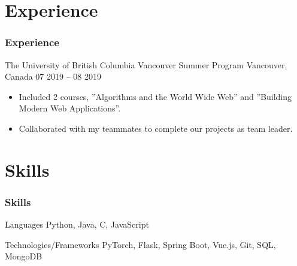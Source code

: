 \documentclass{beamer}
\begin{document}
\section{Experience}
\begin{frame}
    \frametitle{Experience}
    \begin{block}{The University of British Columbia Vancouver Summer Program}
        Vancouver, Canada \hfill 07 2019 – 08 2019
        \begin{itemize}
            \item Included 2 courses, ”Algorithms and the World Wide Web” and ”Building Modern Web Applications”.
            \item Collaborated with my teammates to complete our projects as team leader.
        \end{itemize}
    \end{block}
\end{frame}


\section{Skills}
\begin{frame}
    \frametitle{Skills}
    \begin{block}{Languages}
        Python, Java, C, JavaScript
    \end{block}
    \begin{block}{Technologies/Frameworks}
        PyTorch, Flask, Spring Boot, Vue.js, Git, SQL, MongoDB
    \end{block}
\end{frame}
\end{document}
